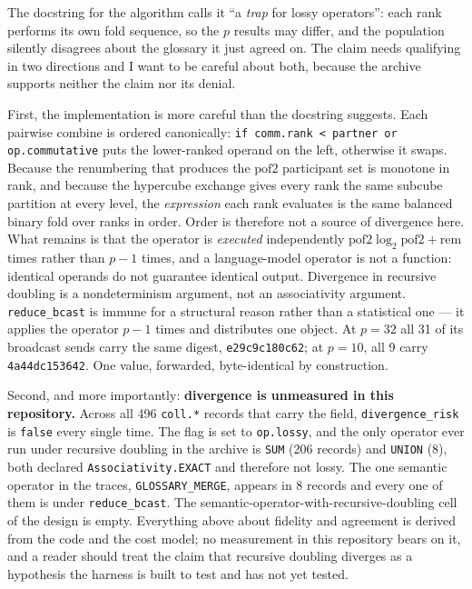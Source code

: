 \documentclass[11pt]{article}
\begin{document}
The docstring for the algorithm calls it ``a \emph{trap} for lossy operators'': each rank
performs its own fold sequence, so the $p$ results may differ, and the population silently
disagrees about the glossary it just agreed on. The claim needs qualifying in two directions and
I want to be careful about both, because the archive supports neither the claim nor its denial.

First, the implementation is more careful than the docstring suggests. Each pairwise combine is
ordered canonically: \texttt{if comm.rank < partner or op.commutative} puts the lower-ranked
operand on the left, otherwise it swaps. Because the renumbering that produces the
$\mathrm{pof2}$ participant set is monotone in rank, and because the hypercube exchange gives
every rank the same subcube partition at every level, the \emph{expression} each rank evaluates
is the same balanced binary fold over ranks in order. Order is therefore not a source of
divergence here. What remains is that the operator is \emph{executed} independently
$\mathrm{pof2}\log_2\mathrm{pof2} + \mathrm{rem}$ times rather than $p-1$ times, and a
language-model operator is not a function: identical operands do not guarantee identical output.
Divergence in recursive doubling is a nondeterminism argument, not an associativity argument.
\texttt{reduce\_bcast} is immune for a structural reason rather than a statistical one --- it
applies the operator $p-1$ times and distributes one object. At $p=32$ all 31 of its broadcast
sends carry the same digest, \texttt{e29c9c180c62}; at $p=10$, all 9 carry
\texttt{4a44dc153642}. One value, forwarded, byte-identical by construction.

Second, and more importantly: \textbf{divergence is unmeasured in this repository.} Across all
496 \texttt{coll.*} records that carry the field, \texttt{divergence\_risk} is \texttt{false}
every single time. The flag is set to \texttt{op.lossy}, and the only operator ever run under
recursive doubling in the archive is \texttt{SUM} (206 records) and \texttt{UNION} (8), both
declared \texttt{Associativity.EXACT} and therefore not lossy. The one semantic operator in the
traces, \texttt{GLOSSARY\_MERGE}, appears in 8 records and every one of them is under
\texttt{reduce\_bcast}. The semantic-operator-with-recursive-doubling cell of the design is
empty. Everything above about fidelity and agreement is derived from the code and the cost model;
no measurement in this repository bears on it, and a reader should treat the claim that
recursive doubling diverges as a hypothesis the harness is built to test and has not yet tested.
\end{document}
